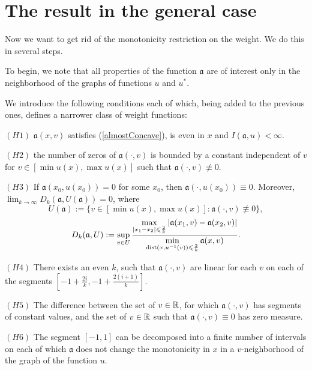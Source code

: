 \section{The result in the general case}

Now we want to get rid of the monotonicity restriction on the weight.
We do this in several steps.

To begin, we note that all properties of the function $\mathfrak a$ are of interest
only in the neighborhood of the graphs of functions $u$ and $u^*$.

We introduce the following conditions each of which, being added to the previous ones, defines a narrower class of weight functions:

\bigskip

\smallskip
\noindent
$(H1)$ $\mathfrak a(x, v)$ satisfies (\ref{almostConcave}), is even in $x$ and $I(\mathfrak a, u) < \infty$.
\smallskip

\bigskip
\noindent
$(H2)$ the number of zeros of $\mathfrak a(\cdot, v)$ is bounded by a constant independent of $v$
for $v \in [\min u(x), \max u(x)]$ such that $\mathfrak a(\cdot, v) \not \equiv 0$.

\bigskip
\noindent
$(H3)$ If $\mathfrak a(x_0, u(x_0)) = 0$ for some $x_0$, then $\mathfrak a(\cdot, u(x_0)) \equiv 0$.
Moreover, $\lim_{k \to \infty} D_k(\mathfrak a, U(\mathfrak a)) = 0$, where
$$U(\mathfrak a) := \{ v \in [\min u(x), \max u(x)]: \mathfrak a(\cdot, v) \not \equiv 0 \},$$
\begin{equation}
\label{bigD}
D_k(\mathfrak a, U): = \sup \limits_{v \in U}
\frac{\max \limits_{\abs{x_1 - x_2} \le \frac{2}{k}} \abs{\mathfrak a(x_1, v) - \mathfrak a(x_2, v)}}
{\min \limits_{\dist (x, u^{-1} (v)) \le \frac{2}{k}} \mathfrak a(x, v)}.
\end{equation}

\bigskip
\noindent
$(H4)$ There exists an even $k$, such that $\mathfrak a(\cdot, v)$ are linear for each $v$ on each of the segments
$[-1 + \frac{2i}{k}, -1 + \frac{2(i + 1)}{k}]$.

\bigskip
\noindent
$(H5)$ The difference between the
set of $v \in \mathbb R$, for which $\mathfrak a(\cdot, v)$ has segments of constant values,
and the set of $v \in \mathbb R$ such that $\mathfrak a(\cdot, v) \equiv 0$
has zero measure.

\bigskip
\noindent
$(H6)$ The segment $[-1, 1]$ can be decomposed into a finite number of intervals
on each of which $\mathfrak a$ does not change the monotonicity in $x$ in a $v$-neighborhood of the graph of the function $u$.

